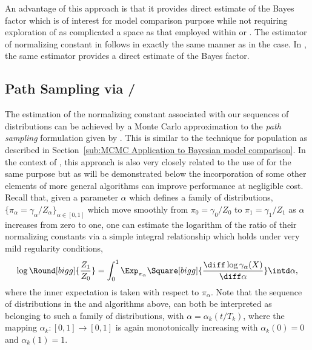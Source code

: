 

An advantage of this approach is that it provides direct estimate of the Bayes
factor which is of interest for model comparison purpose while not requiring
exploration of as complicated a space as that employed within \rjmcmc or
\smc[1]. The estimator of normalizing constant in \smc[3] follows in
exactly the same manner as in the \smc[2] case. In \smc[3], the same estimator
provides a direct estimate of the Bayes factor.

\subsection{Path Sampling via \smc[2]/\smc[3]}
\label{sub:Path Sampling via smc2/smc3}

The estimation of the normalizing constant associated with our sequences of
distributions can be achieved by a Monte Carlo approximation to the \emph{path
  sampling} formulation given by \cite{Gelman:1998ei}. This is similar to the
technique for population \mcmc as described in Section~\ref{sub:MCMC
  Application to Bayesian model comparison}. In the context of \smc, this
approach is also very closely related to the use of \ais for the same purpose
\cite{Neal:2001we} but as will be demonstrated below the incorporation of some
other elements of more general \smc algorithms can improve performance at
negligible cost. Recall that, given a parameter $\alpha$ which defines a
family of distributions, $\{\pi_{\alpha} = \gamma_{\alpha} / Z_\alpha\}_{\alpha \in
  [0,1]}$ which move smoothly from $\pi_0 = \gamma_0 / Z_0$ to $\pi_1 =
\gamma_1 / Z_1$ as $\alpha$ increases from zero to one, one can estimate the
logarithm of the ratio of their normalizing constants via a simple integral
relationship which holds under very mild regularity conditions,
\begin{equation*}
  \log\Round[bigg]{\frac{Z_1}{Z_0}} =
  \int_{0}^{1} \Exp_{\pi_\alpha} \Square[bigg]{
    \frac{\diff\log\gamma_{\alpha}(X)}{\diff\alpha}
  } \intd\alpha,
\end{equation*}
where the inner expectation is taken with respect to $\pi_{\alpha}$. Note that
the sequence of distributions in the \smc[2] and \smc[3] algorithms above, can
both be interpreted as belonging to such a family of distributions, with
$\alpha = \alpha_k(t/T_k)$, where the mapping $\alpha_k:[0,1]\to[0,1]$ is
again monotonically increasing with $\alpha_k(0) = 0$ and $\alpha_k(1) = 1$.

